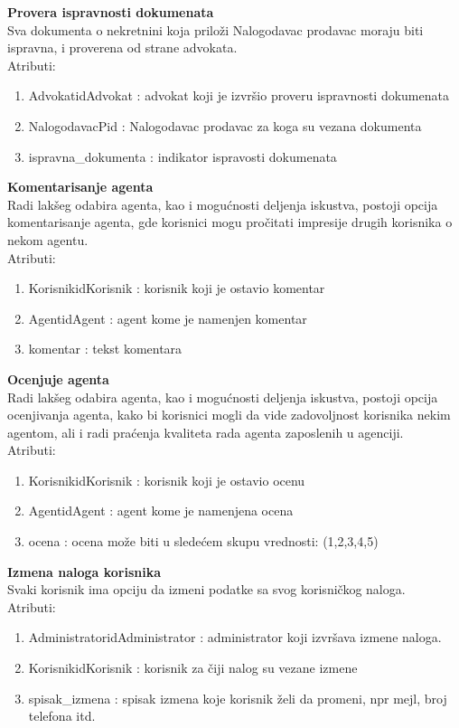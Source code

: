 \documentclass[20pt]{article}
\begin{document}
{\bfseries Provera ispravnosti dokumenata}\\
Sva dokumenta o nekretnini koja prilo\v {z}i Nalogodavac prodavac moraju biti ispravna, i proverena od strane advokata.\\
\indent Atributi:
\begin{enumerate}
        \item  AdvokatidAdvokat : advokat koji je izvr\v {s}io proveru ispravnosti dokumenata
        \item  NalogodavacPid : Nalogodavac prodavac za koga su vezana dokumenta
        \item  ispravna\_dokumenta : indikator ispravosti dokumenata
\end{enumerate}
{\bfseries Komentarisanje agenta}\\
Radi lak\v {s}eg odabira agenta, kao i mogu\' cnosti deljenja iskustva, postoji opcija komentarisanje agenta, gde korisnici mogu pro\v {c}itati impresije drugih korisnika o nekom agentu.\\
\indent Atributi:
\begin{enumerate}
        \item  KorisnikidKorisnik : korisnik koji je ostavio komentar
        \item  AgentidAgent : agent kome je namenjen komentar
        \item  komentar : tekst komentara
\end{enumerate}
\newpage
{\bfseries Ocenjuje agenta}\\
Radi lak\v {s}eg odabira agenta, kao i mogu\' cnosti deljenja iskustva, postoji opcija ocenjivanja agenta, kako bi korisnici mogli da vide zadovoljnost korisnika nekim agentom, ali i radi pra\' cenja kvaliteta rada agenta zaposlenih u agenciji.\\
\indent Atributi:
\begin{enumerate}
        \item  KorisnikidKorisnik : korisnik koji je ostavio ocenu
        \item  AgentidAgent : agent kome je namenjena ocena
        \item  ocena : ocena mo\v {z}e biti u slede\' cem skupu vrednosti: (1,2,3,4,5)
\end{enumerate}
{\bfseries Izmena naloga korisnika}\\
Svaki korisnik ima opciju da izmeni podatke sa svog korisni\v {c}kog naloga.\\
\indent Atributi:
\begin{enumerate}
        \item  AdministratoridAdministrator : administrator koji izvr\v {s}ava izmene naloga.
        \item  KorisnikidKorisnik : korisnik za \v {c}iji nalog su vezane izmene
        \item  spisak\_izmena : spisak izmena koje korisnik \v {z}eli da promeni, npr mejl, broj telefona itd.
\end{enumerate}
\end{document}
